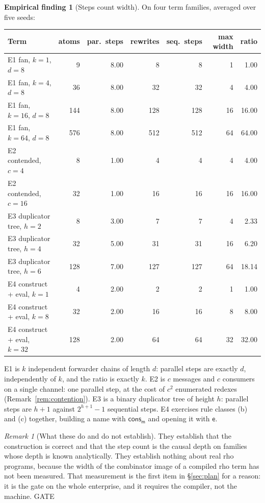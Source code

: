 \documentclass[11pt,a4paper]{article}
\theoremstyle{plain}
\theoremstyle{definition}
\newtheorem{finding}[theorem]{Empirical finding}
\theoremstyle{remark}
\newtheorem{remark}[theorem]{Remark}
\newcommand{\rhoc}{\textsf{rho}}
\newcommand{\mm}{\mathsf{m}}
\newcommand{\ev}{\mathsf{e}}
\newcommand{\consm}{\mathsf{cons}_{\mm}}
\begin{document}
\begin{finding}[Steps count width]
\label{find:width}
On four term families, averaged over five seeds:
\begin{center}\small
\begin{tabular}{@{}lrrrrrr@{}}
\toprule
\textbf{Term} & \textbf{atoms} & \textbf{par.\ steps} & \textbf{rewrites} &
\textbf{seq.\ steps} & \textbf{max width} & \textbf{ratio} \\
\midrule
E1 fan, $k=1$, $d=8$    &   9 & 8.00 &   8 &   8 &  1 & 1.00 \\
E1 fan, $k=4$, $d=8$    &  36 & 8.00 &  32 &  32 &  4 & 4.00 \\
E1 fan, $k=16$, $d=8$   & 144 & 8.00 & 128 & 128 & 16 & 16.00 \\
E1 fan, $k=64$, $d=8$   & 576 & 8.00 & 512 & 512 & 64 & 64.00 \\
\midrule
E2 contended, $c=4$     &   8 & 1.00 &   4 &   4 &  4 & 4.00 \\
E2 contended, $c=16$    &  32 & 1.00 &  16 &  16 & 16 & 16.00 \\
\midrule
E3 duplicator tree, $h=2$ &   8 & 3.00 &   7 &   7 &  4 & 2.33 \\
E3 duplicator tree, $h=4$ &  32 & 5.00 &  31 &  31 & 16 & 6.20 \\
E3 duplicator tree, $h=6$ & 128 & 7.00 & 127 & 127 & 64 & 18.14 \\
\midrule
E4 construct + eval, $k=1$  &   4 & 2.00 &  2 &  2 &  1 & 1.00 \\
E4 construct + eval, $k=8$  &  32 & 2.00 & 16 & 16 &  8 & 8.00 \\
E4 construct + eval, $k=32$ & 128 & 2.00 & 64 & 64 & 32 & 32.00 \\
\bottomrule
\end{tabular}
\end{center}
E1 is $k$ independent forwarder chains of length $d$: parallel steps are
exactly $d$, independently of $k$, and the ratio is exactly $k$. E2 is $c$
messages and $c$ consumers on a single channel: one parallel step, at the cost
of $c^{2}$ enumerated redexes (Remark~\ref{rem:contention}). E3 is a binary
duplicator tree of height $h$: parallel steps are $h+1$ against $2^{h+1}-1$
sequential steps. E4 exercises rule classes (b) and (c) together, building a
name with $\consm$ and opening it with $\ev$.
\end{finding}

\begin{remark}[What these do and do not establish]
They establish that the construction is correct and that the step count is the
causal depth on families whose depth is known analytically. They establish
nothing about real \rhoc{} programs, because the width of the combinator image
of a compiled \rhoc{} term has not been measured. That measurement is the
first item in \S\ref{sec:plan} for a reason: it is the gate on the whole
enterprise, and it requires the compiler, not the machine. \textsf{GATE}
\end{remark}
\end{document}
